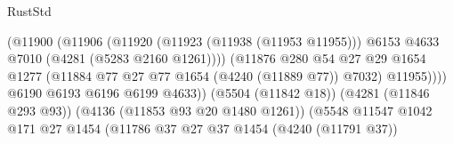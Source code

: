 \begin{lexlean}{RustStd}
\begin{coremodule}
{\begin{coremodule}
{{{{{{{{{{{{{{{{{{{{{{{{{{{{{{{{{{{                                                    (@11900
                                                      (@11906
                                                        (@11920
                                                          (@11923 (@11938 (@11953 @11955)))
                                                          @6153
                                                          @4633
                                                          @7010
                                                          (@4281 (@5283 @2160 @1261))))
                                                      (@11876
                                                        @280
                                                        @54
                                                        @27
                                                        @29
                                                        @1654
                                                        @1277
                                                        (@11884
                                                          @77
                                                          @27
                                                          @77
                                                          @1654
                                                          (@4240 (@11889 @77))
                                                          @7032)
                                                        @11955))))
                                                @6190
                                                @6193
                                                @6196
                                                @6199
                                                @4633))
                                            (@5504 (@11842 @18))
                                            (@4281 (@11846 @293 @93))
                                            (@4136 (@11853 @93 @20 @1480 @1261))
                                            (@5548
                                              @11547
                                              @1042
                                              @171
                                              @27
                                              @1454
                                              (@11786
                                                @37
                                                @27
                                                @37
                                                @1454
                                                (@4240 (@11791 @37))
}}}}}}}}}}}}}}}}}}}}}}}}}}}}}}}}}}}
\end{coremodule}}
\end{coremodule}
\end{lexlean}
